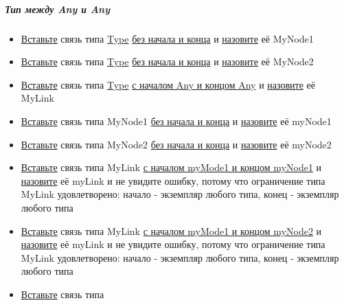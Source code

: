 \documentclass{article}
\begin{document}
\subparagraph{Тип между Any и Any}
\begin{itemize}
  \item \hyperlink{DeepCase.InsertLink.Description}{Вставьте} связь типа
        \hyperlink{Core.Type.Description}{Type}
        \hyperlink{FAQ.HowToInsertLinkWithoutFromAndTo}{без
          начала и конца} и \hyperlink{FAQ.HowToSetName}{назовите} её
        MyNode1
  \item \hyperlink{DeepCase.InsertLink.Description}{Вставьте} связь типа
        \hyperlink{Core.Type.Description}{Type}
        \hyperlink{FAQ.HowToInsertLinkWithoutFromAndTo}{без
          начала и конца} и \hyperlink{FAQ.HowToSetName}{назовите} её
        MyNode2
  \item \hyperlink{DeepCase.InsertLink.Description}{Вставьте} связь типа
        \hyperlink{Core.Type.Description}{Type}
        \hyperlink{FAQ.HowToInsertLinkWithFromAndTo}{с
          началом Any и концом Any} и
        \hyperlink{FAQ.HowToSetName}{назовите} её
        MyLink
  \item \hyperlink{DeepCase.InsertLink.Description}{Вставьте} связь типа
        MyNode1
        \hyperlink{FAQ.HowToInsertLinkWithoutFromAndTo}{без начала и конца}
        и
        \hyperlink{FAQ.HowToSetName}{назовите} её myNode1
  \item \hyperlink{DeepCase.InsertLink.Description}{Вставьте} связь типа
        MyNode2
        \hyperlink{FAQ.HowToInsertLinkWithoutFromAndTo}{без начала и конца}
        и
        \hyperlink{FAQ.HowToSetName}{назовите} её myNode2
  \item \hyperlink{DeepCase.InsertLink.Description}{Вставьте} связь типа
        MyLink
        \hyperlink{FAQ.HowToInsertLinkWithFromAndTo}{с началом myMode1 и
          концом
          myNode1} и \hyperlink{FAQ.HowToSetName}{назовите} её myLink и
        не
        увидите
        ошибку, потому что ограничение типа MyLink удовлетворено: начало -
        экземпляр
        любого типа, конец - экземпляр любого типа
  \item \hyperlink{DeepCase.InsertLink.Description}{Вставьте} связь типа
        MyLink
        \hyperlink{FAQ.HowToInsertLinkWithFromAndTo}{с началом myMode1 и
          концом
          myNode2} и \hyperlink{FAQ.HowToSetName}{назовите} её myLink и
        не
        увидите
        ошибку, потому что ограничение типа MyLink удовлетворено: начало -
        экземпляр
        любого типа, конец - экземпляр любого типа
  \item \hyperlink{DeepCase.InsertLink.Description}{Вставьте} связь типа

\end{itemize}
\end{document}
